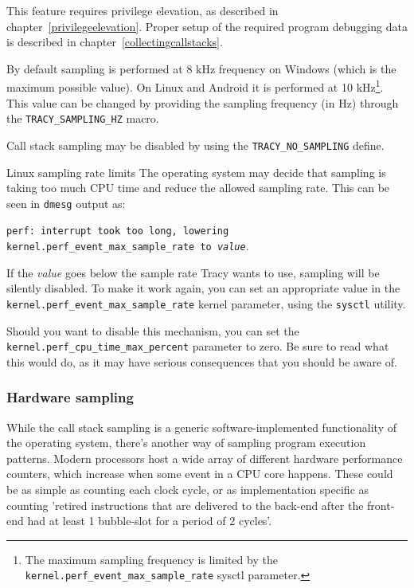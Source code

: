 \documentclass[hidelinks,titlepage,a4paper]{article}
\begin{document}
This feature requires privilege elevation, as described in chapter~\ref{privilegeelevation}. Proper setup of the required program debugging data is described in chapter~\ref{collectingcallstacks}.

By default sampling is performed at 8 kHz frequency on Windows (which is the maximum possible value). On Linux and Android it is performed at 10 kHz\footnote{The maximum sampling frequency is limited by the \texttt{kernel.perf\_event\_max\_sample\_rate} sysctl parameter.}. This value can be changed by providing the sampling frequency (in Hz) through the \texttt{TRACY\_SAMPLING\_HZ} macro.

Call stack sampling may be disabled by using the \texttt{TRACY\_NO\_SAMPLING} define.

\begin{bclogo}[
noborder=true,
couleur=black!5,
logo=\bcbombe
]{Linux sampling rate limits}
The operating system may decide that sampling is taking too much CPU time and reduce the allowed sampling rate. This can be seen in \texttt{dmesg} output as:

\texttt{perf: interrupt took too long, lowering kernel.perf\_event\_max\_sample\_rate to \emph{value}}.

If the \emph{value} goes below the sample rate Tracy wants to use, sampling will be silently disabled. To make it work again, you can set an appropriate value in the \texttt{kernel.perf\_event\_max\_sample\_rate} kernel parameter, using the \texttt{sysctl} utility.

Should you want to disable this mechanism, you can set the \texttt{kernel.perf\_cpu\_time\_max\_percent} parameter to zero. Be sure to read what this would do, as it may have serious consequences that you should be aware of.
\end{bclogo}

\subsubsection{Hardware sampling}
\label{hardwaresampling}

While the call stack sampling is a generic software-implemented functionality of the operating system, there's another way of sampling program execution patterns. Modern processors host a wide array of different hardware performance counters, which increase when some event in a CPU core happens. These could be as simple as counting each clock cycle, or as implementation specific as counting 'retired instructions that are delivered to the back-end after the front-end had at least 1 bubble-slot for a period of 2 cycles'.
\end{document}

